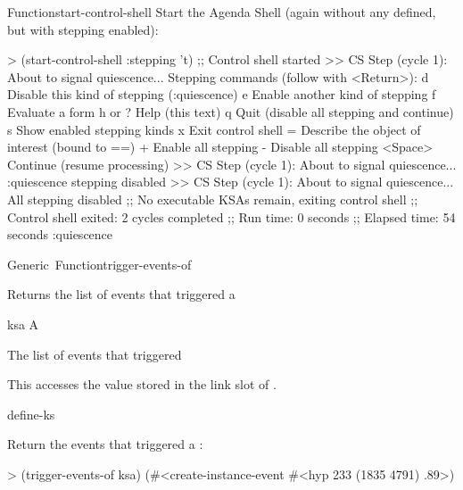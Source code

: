 \documentclass[10pt,twoside,english,pdftex]{article}
\begin{document}
\begin{functiondoc}{Function}{start-control-shell}
Start the Agenda Shell (again without any  defined, but with
stepping enabled):
\begin{example}
> (start-control-shell :stepping 't)
;; Control shell started
>> CS Step (cycle 1):
   About to signal quiescence... 
Stepping commands (follow with <Return>):
   d       Disable this kind of stepping (:quiescence)
   e       Enable another kind of stepping
   f       Evaluate a form
   h or ?  Help (this text)
   q       Quit (disable all stepping and continue)
   s       Show enabled stepping kinds
   x       Exit control shell
   =       Describe the object of interest (bound to ==)
   +       Enable all stepping
   -       Disable all stepping
   <Space> Continue (resume processing)
>> CS Step (cycle 1):
   About to signal quiescence... 
:quiescence stepping disabled
>> CS Step (cycle 1):
   About to signal quiescence... 
All stepping disabled
;; No executable KSAs remain, exiting control shell
;; Control shell exited: 2 cycles completed
;; Run time: 0 seconds
;; Elapsed time: 54 seconds
:quiescence
\end{example}

%
\fnnotes \pollingnote

\end{functiondoc}


\begin{functiondoc}{Generic~Function}{trigger-events-of}{ 
    \returns{} }
%
%

\fnsyntax

\fnpurpose Returns the list of events that triggered a 

\fnmethods
{}

\fnpackage {}

\fnmodule {}

\fnargs
\begin{args}{ksa}
\arg[ksa] A 
\end{args}

\fnreturns The list of events that triggered 
  
\fndescription 
This  accesses the value stored in the
 link slot of .

\begin{alsos}{define-ks}
\also[define-ks]
\also[ks]
\also[ksa]
\end{alsos}

\fnexample
Return the events that triggered a :
\begin{example}
> (trigger-events-of ksa)
(#<create-instance-event #<hyp 233 (1835 4791) .89>)
\end{example}

\end{functiondoc}
\end{document}
